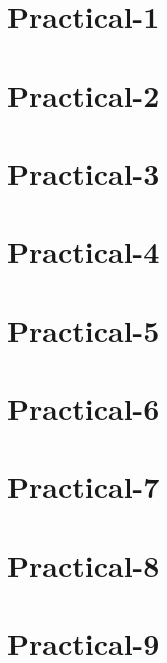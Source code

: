 \documentclass[12pt]{report}
\begin{document}




\footskip 0.7cm
\thispagestyle{empty} 
\pagetitle
\newpage
{}
\cfoot{\thepage}




\cfoot{\thepage}

\newpage

\chapter{Practical-1}

\chapter{Practical-2}

\chapter{Practical-3}

\chapter{Practical-4}

\chapter{Practical-5}

\chapter{Practical-6}

\chapter{Practical-7}

\chapter{Practical-8}

\chapter{Practical-9}

\end{document}
